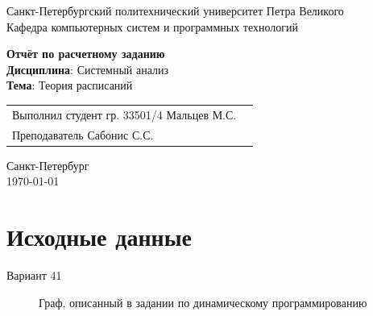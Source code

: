 \documentclass[a4paper,14pt]{extarticle}
\begin{document}
\begin{titlepage}
\centering
Санкт-Петербургский политехнический университет Петра Великого \\
\vspace{0.15cm}
Кафедра компьютерных систем и программных технологий \\
\vspace{6.5cm}

{\centering \textbf{Отчёт по расчетному заданию} \\ 
\vspace{0.15cm}
\textbf{Дисциплина}: Системный анализ \\
\vspace{0.15cm}
\textbf{Тема}: Теория расписаний} \\

\vspace{6.5cm}

\begin{table}[H]
\begin{tabular}{p{\textwidth}@{}r}
{Выполнил студент гр. 33501/4} \hfill {Мальцев  М.С.} \\
{Преподаватель} \hfill {Сабонис С.С.} \\
\end{tabular}
\end{table}
\vfill

{\centering Санкт-Петербург \\ 
\vspace{0.15cm}
\today}
\end{titlepage}

\section{Исходные данные}

\begin{center}
\large{Вариант 41}
\end{center}

\begin{figure}[h]
\caption{Граф, описанный в задании по динамическому программированию}
\label{ris:image}
\end{figure}
\end{document}

